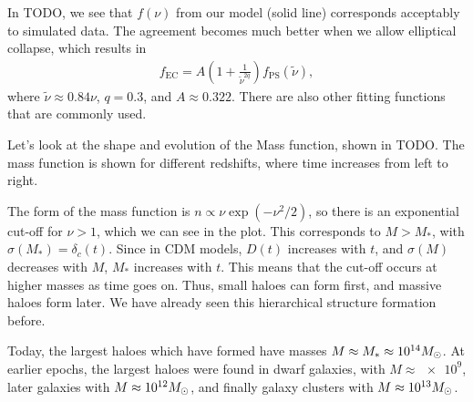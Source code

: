 
In TODO, we see that $f(\nu)$ from our model (solid line) corresponds acceptably to simulated data.
The agreement becomes much better when we allow elliptical collapse, which results in
\begin{align*}
	f_\text{EC}
	= A\left( 1 + \frac{1}{\tilde{\nu}^{2q}} \right) f_\text{PS}(\tilde{\nu}),
\end{align*}
where $\tilde{\nu} \approx 0.84 \nu$, $q = 0.3$, and $A \approx 0.322$.
There are also other fitting functions that are commonly used.

Let's look at the shape and evolution of the Mass function, shown in TODO.
The mass function is shown for different redshifts, where time increases from left to right.

The form of the mass function is $n \propto \nu \exp(-\nu^2/2)$, 
so there is an exponential cut-off for $\nu > 1$,
which we can see in the plot.
This corresponds to $M > M_*$, with $\sigma(M_*) = \delta_c(t)$.
Since in CDM models, $D(t)$ increases with $t$, and $\sigma(M)$ decreases with $M$,
$M_*$ increases with $t$.
This means that the cut-off occurs at higher masses as time goes on.
Thus, small haloes can form first, and massive haloes form later.
We have already seen this hierarchical structure formation before.

Today, the largest haloes which have formed have masses $M \approx M_* \approx \num{e14} M_\odot$.
At earlier epochs, the largest haloes were found in dwarf galaxies, with $M \approx \num{e9}$,
later galaxies with $M \approx \num{e12} M_\odot$,
and finally galaxy clusters with  $M \approx \num{e13} M_\odot$.


